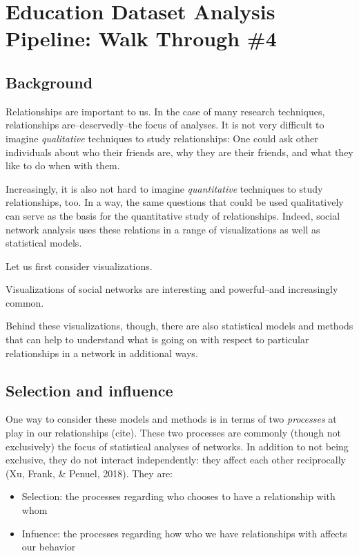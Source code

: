 \documentclass[]{book}
\providecommand{\tightlist}{%
  \setlength{\itemsep}{0pt}\setlength{\parskip}{0pt}}
\begin{document}
\chapter{Education Dataset Analysis Pipeline: Walk Through
\#4}\label{education-dataset-analysis-pipeline-walk-through-4}

\section{Background}\label{background-2}

Relationships are important to us. In the case of many research
techniques, relationships are--deservedly--the focus of analyses. It is
not very difficult to imagine \emph{qualitative} techniques to study
relationships: One could ask other individuals about who their friends
are, why they are their friends, and what they like to do when with
them.

Increasingly, it is also not hard to imagine \emph{quantitative}
techniques to study relationships, too. In a way, the same questions
that could be used qualitatively can serve as the basis for the
quantitative study of relationships. Indeed, social network analysis
uses these relations in a range of visualizations as well as statistical
models.

Let us first consider visualizations.

Visualizations of social networks are interesting and powerful--and
increasingly common.

Behind these visualizations, though, there are also statistical models
and methods that can help to understand what is going on with respect to
particular relationships in a network in additional ways.

\section{Selection and influence}\label{selection-and-influence}

One way to consider these models and methods is in terms of two
\emph{processes} at play in our relationships (cite). These two
processes are commonly (though not exclusively) the focus of statistical
analyses of networks. In addition to not being exclusive, they do not
interact independently: they affect each other reciprocally (Xu, Frank,
\& Penuel, 2018). They are:

\begin{itemize}
\tightlist
\item
  Selection: the processes regarding who chooses to have a relationship
  with whom
\item
  Infuence: the processes regarding how who we have relationships with
  affects our behavior
\end{itemize}
\end{document}
